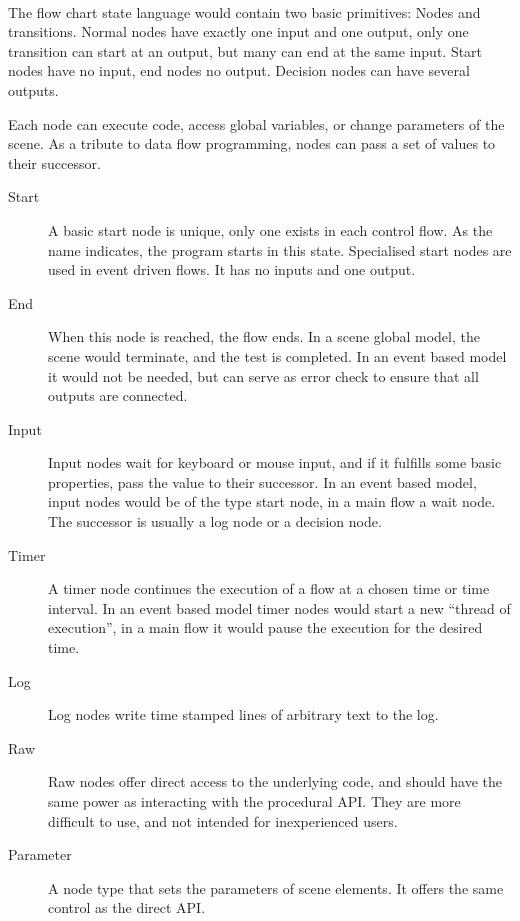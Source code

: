 \paragraph{}
The flow chart state language would contain two basic primitives: Nodes and transitions.
Normal nodes have exactly one input and one output, only one transition can start at an output, but many can end at the same input. Start nodes have no input, end nodes no output. Decision nodes can have several outputs.

Each node can  execute code, access global variables, or change parameters of the scene.
As a tribute to data flow programming, nodes can pass a set of values to their successor.

\begin{description}
\item[Start]
A basic start node is unique, only one exists in each control flow.
As the name indicates, the program starts in this state.
Specialised start nodes are used in event driven flows.
It has no inputs and one output.

\item[End]
When this node is reached, the flow ends.
In a scene global model, the scene would terminate, and the test is completed.
In an event based model it would not be needed, but can serve as error check to ensure that all outputs are connected.

\item[Input]
Input nodes wait for keyboard or mouse input, and if it fulfills some basic properties, pass the value to their successor.
In an event based model, input nodes would be of the type start node, in a main flow a wait node.
The successor is usually a log node or a decision node.

\item[Timer]
A timer node continues the execution of a flow at a chosen time or time interval.
In an event based model timer nodes would start a new ``thread of execution'',
in a main flow it would pause the execution for the desired time.

\item[Log]
Log nodes write time stamped lines of arbitrary text to the log.

\item[Raw]
Raw nodes offer direct access to the underlying code, and should have the same power as interacting with the procedural API.
They are more difficult to use, and not intended for inexperienced users.

\item[Parameter]
A node type that sets the parameters of scene elements.
It offers the same control as the direct API.

\end{description}

